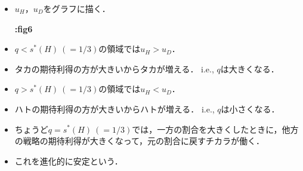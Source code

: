 \documentclass[uplatex,12pt,dvipdfmx,xcolor=svgnames]{beamer}
\begin{document}
\begin{frame}[t]{\secIV}

\begin{itemize}
	\item $u_H$，$u_D$をグラフに描く．
		
			
			\textbf{:fig6}
		
	\item $q<s^*(H)\ (=1/3)$の領域では$u_H>u_D$．
	\item タカの期待利得の方が大きいからタカが増える．
		i.e., $q$は大きくなる．
	\item $q>s^*(H)\ (=1/3)$の領域では$u_H<u_D$．
	\item ハトの期待利得の方が大きいからハトが増える．
		i.e., $q$は小さくなる．
	\item ちょうど$q=s^*(H)\ (=1/3)$では，一方の割合を大きくしたときに，他方の戦略の期待利得が大きくなって，元の割合に戻すチカラが働く．
	\item これを進化的に安定という．
\end{itemize}


	
\end{frame}
\end{document}
